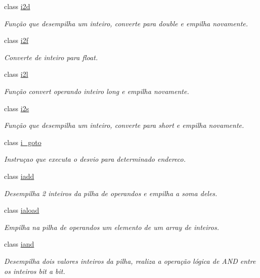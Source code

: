 \begin{DoxyCompactItemize}
class \hyperlink{class_instruction_impl_1_1i2d}{i2d}
\begin{DoxyCompactList}\small\item\em Função que desempilha um inteiro, converte para double e empilha novamente. \end{DoxyCompactList}\item 
class \hyperlink{class_instruction_impl_1_1i2f}{i2f}
\begin{DoxyCompactList}\small\item\em Converte de inteiro para float. \end{DoxyCompactList}\item 
class \hyperlink{class_instruction_impl_1_1i2l}{i2l}
\begin{DoxyCompactList}\small\item\em Função convert operando inteiro long e empilha novamente. \end{DoxyCompactList}\item 
class \hyperlink{class_instruction_impl_1_1i2s}{i2s}
\begin{DoxyCompactList}\small\item\em Função que desempilha um inteiro, converte para short e empilha novamente. \end{DoxyCompactList}\item 
class \hyperlink{class_instruction_impl_1_1i__goto}{i\+\_\+goto}
\begin{DoxyCompactList}\small\item\em Instruçao que executa o desvio para determinado endereco. \end{DoxyCompactList}\item 
class \hyperlink{class_instruction_impl_1_1iadd}{iadd}
\begin{DoxyCompactList}\small\item\em Desempilha 2 inteiros da pilha de operandos e empilha a soma deles. \end{DoxyCompactList}\item 
class \hyperlink{class_instruction_impl_1_1iaload}{iaload}
\begin{DoxyCompactList}\small\item\em Empilha na pilha de operandos um elemento de um array de inteiros. \end{DoxyCompactList}\item 
class \hyperlink{class_instruction_impl_1_1iand}{iand}
\begin{DoxyCompactList}\small\item\em Desempilha dois valores inteiros da pilha, realiza a operação lógica de A\+ND entre os inteiros bit a bit. \end{DoxyCompactList}\item 

\end{DoxyCompactItemize}
